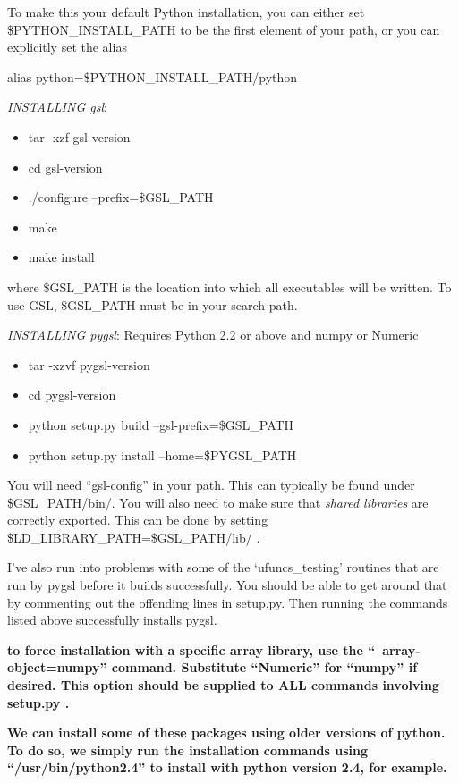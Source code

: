 To make this your default Python installation, you can either set \$PYTHON\_INSTALL\_PATH to be the first element of your path, or you can explicitly set the alias

alias python=\$PYTHON\_INSTALL\_PATH/python

\emph{INSTALLING gsl}:
\begin{itemize}
  \item{tar -xzf gsl-version}
  \item{cd gsl-version}
  \item{./configure --prefix=\$GSL\_PATH}
  \item{make}
  \item{make install}
\end{itemize}

where \$GSL\_PATH is the location into which all executables will be written. To use GSL, \$GSL\_PATH must be in your search path.

\emph{INSTALLING pygsl}:
Requires Python 2.2 or above and numpy or Numeric
\begin{itemize}
  \item{tar -xzvf pygsl-version}
  \item{cd pygsl-version}
  \item{python setup.py build --gsl-prefix=\$GSL\_PATH}
  \item{python setup.py install --home=\$PYGSL\_PATH}
\end{itemize}

You will need ``gsl-config'' in your path. This can typically be found under \$GSL\_PATH/bin/. You will also need to make sure that \emph{shared libraries} are correctly exported. This can be done by setting \$LD\_LIBRARY\_PATH=\$GSL\_PATH/lib/ .

I've also run into problems with some of the `ufuncs\_testing' routines that are run by pygsl before it builds successfully. You should be able to get around that by commenting out the offending lines in setup.py. Then running the commands listed above successfully installs pygsl. 

\textbf{to force installation with a specific array library, use the ``--array-object=numpy'' command. Substitute ``Numeric'' for ``numpy'' if desired. This option should be supplied to ALL commands involving setup.py .}

\textbf{We can install some of these packages using older versions of python. To do so, we simply run the installation commands using ``/usr/bin/python2.4'' to install with python version 2.4, for example.}

